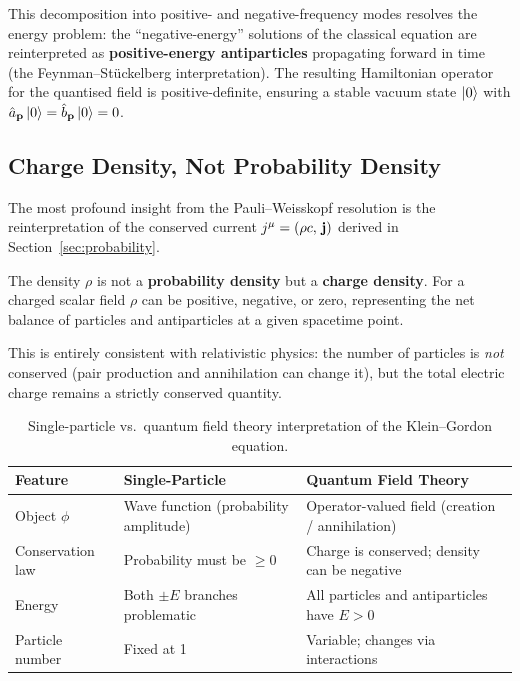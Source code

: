 \documentclass[12pt, a4paper]{article}
\theoremstyle{definition}
\begin{document}
This decomposition into positive- and negative-frequency modes resolves the
energy problem: the ``negative-energy'' solutions of the classical equation
are reinterpreted as \textbf{positive-energy antiparticles} propagating
forward in time (the Feynman--St\"{u}ckelberg interpretation).  The resulting
Hamiltonian operator for the quantised field is positive-definite, ensuring a
stable vacuum state $\ket{0}$ with $\hat{a}_{\vb{p}}\ket{0} =
\hat{b}_{\vb{p}}\ket{0} = 0$.

\subsection{Charge Density, Not Probability Density}

The most profound insight from the Pauli--Weisskopf resolution is the
reinterpretation of the conserved current $j^{\mu} = (\rho c,\,\vb{j})$
derived in Section~\ref{sec:probability}.

\begin{result}
The density $\rho$ is not a \textbf{probability density} but a
\textbf{charge density}.  For a charged scalar field $\rho$ can be positive,
negative, or zero, representing the net balance of particles and antiparticles
at a given spacetime point.
\end{result}

This is entirely consistent with relativistic physics: the number of particles
is \emph{not} conserved (pair production and annihilation can change it), but
the total electric charge remains a strictly conserved quantity.

\renewcommand{\arraystretch}{1.3}
\begin{table}[h]
\centering
\caption{Single-particle vs.\ quantum field theory interpretation of the Klein--Gordon equation.}
\begin{tabular}{@{}lp{5cm}p{5.5cm}@{}}
\toprule
\textbf{Feature}
    & \textbf{Single-Particle}
    & \textbf{Quantum Field Theory} \\
\midrule
Object $\phi$
    & Wave function (probability amplitude)
    & Operator-valued field (creation / annihilation) \\
Conservation law
    & Probability must be $\geq 0$
    & Charge is conserved; density can be negative \\
Energy
    & Both $\pm E$ branches problematic
    & All particles and antiparticles have $E>0$ \\
Particle number
    & Fixed at 1
    & Variable; changes via interactions \\
\bottomrule
\end{tabular}
\end{table}
\end{document}
